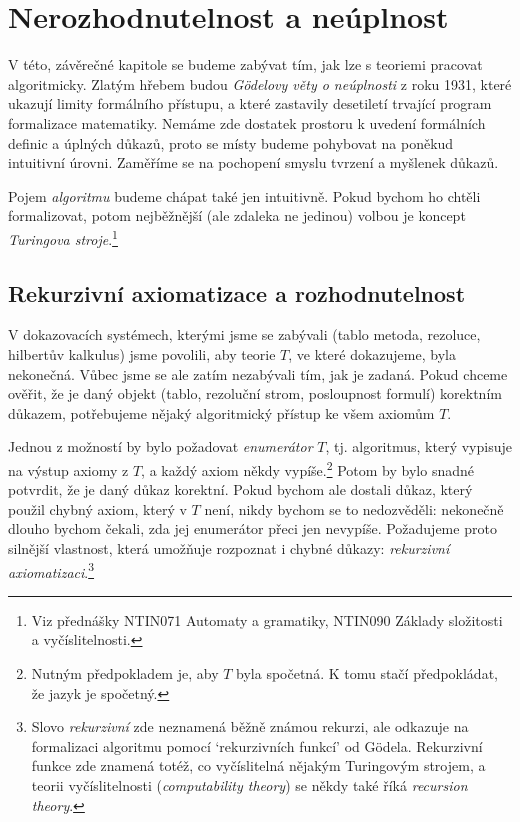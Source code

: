 \chapter{Nerozhodnutelnost a neúplnost}

V této, závěrečné kapitole se budeme zabývat tím, jak lze s teoriemi pracovat algoritmicky. Zlatým hřebem budou \emph{Gödelovy věty o neúplnosti} z roku 1931, které ukazují limity formálního přístupu, a které zastavily desetiletí trvající program formalizace matematiky. Nemáme zde dostatek prostoru k uvedení formálních definic a úplných důkazů, proto se místy budeme pohybovat na poněkud intuitivní úrovni. Zaměříme se na pochopení smyslu tvrzení a myšlenek důkazů.

Pojem \emph{algoritmu} budeme chápat také jen intuitivně. Pokud bychom ho chtěli formalizovat, potom nejběžnější (ale zdaleka ne jedinou) volbou je koncept \emph{Turingova stroje}.\footnote{Viz přednášky NTIN071 Automaty a gramatiky, NTIN090 Základy složitosti a vyčíslitelnosti.}

\section{Rekurzivní axiomatizace a rozhodnutelnost}

V dokazovacích systémech, kterými jsme se zabývali (tablo metoda, rezoluce, hilbertův kalkulus) jsme povolili, aby teorie $T$, ve které dokazujeme, byla nekonečná. Vůbec jsme se ale zatím nezabývali tím, jak je zadaná. Pokud chceme ověřit, že je daný objekt (tablo, rezoluční strom, posloupnost formulí) korektním důkazem, potřebujeme nějaký algoritmický přístup ke všem axiomům $T$. 

Jednou z možností by bylo požadovat \emph{enumerátor} $T$, tj. algoritmus, který vypisuje na výstup axiomy z $T$, a každý axiom někdy vypíše.\footnote{Nutným předpokladem je, aby $T$ byla spočetná. K tomu stačí předpokládat, že jazyk je spočetný.} Potom by bylo snadné potvrdit, že je daný důkaz korektní. Pokud bychom ale dostali důkaz, který použil chybný axiom, který v $T$ není, nikdy bychom se to nedozvěděli: nekonečně dlouho bychom čekali, zda jej enumerátor přeci jen nevypíše. Požadujeme proto silnější vlastnost, která umožňuje rozpoznat i chybné důkazy: \emph{rekurzivní axiomatizaci}.\footnote{Slovo \emph{rekurzivní} zde neznamená běžně známou rekurzi, ale odkazuje na formalizaci algoritmu pomocí `rekurzivních funkcí' od Gödela. Rekurzivní funkce zde znamená totéž, co vyčíslitelná nějakým Turingovým strojem, a teorii vyčíslitelnosti (\emph{computability theory}) se někdy také říká \emph{recursion theory}.}

